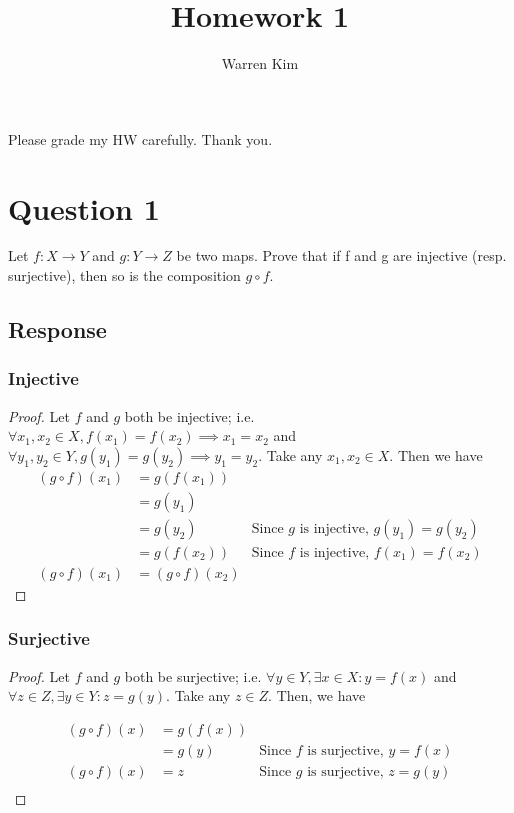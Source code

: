 \documentclass[13pt]{article}
\title{Homework 1}
\author{Warren Kim}
\begin{document}
\maketitle

\begin{center}Please grade my HW carefully. Thank you.\end{center}

\newpage
\section*{Question 1}
Let $f : X \to Y$ and $g : Y \to Z$ be two maps. Prove that if f and g are injective
(resp. surjective), then so is the composition $g \circ f$.

\subsection*{Response}

\subsubsection*{Injective}
\begin{proof}
  Let $f$ and $g$ both be injective; i.e. $\forall x_1, x_2 \in X, f(x_1) = f(x_2) \implies x_1 = x_2$ and
  $\forall y_1, y_2 \in Y, g(y_1) = g(y_2) \implies y_1 = y_2$. Take any $x_1, x_2 \in X$. Then we have
  \begin{align*}
    (g \circ f) (x_1) &= g(f(x_1)) \\
                    &= g(y_1) \\
                    &= g(y_2) & \text{Since $g$ is injective, $g(y_1) = g(y_2)$} \\
                    &= g(f(x_2)) & \text{Since $f$ is injective, $f(x_1) = f(x_2)$} \\
    (g \circ f) (x_1) &= (g \circ f) (x_2)
  \end{align*}
\end{proof}


\subsubsection*{Surjective}
\begin{proof}
  Let $f$ and $g$ both be surjective; i.e. $\forall y \in Y, \exists x \in X : y = f(x)$ and
  $\forall z \in Z, \exists y \in Y : z = g(y)$. Take any $z \in Z$. Then, we have
  
  \begin{align*}
    (g \circ f) (x) &= g(f(x)) \\
                    &= g(y) & \text{Since $f$ is surjective, $y = f(x)$} \\
    (g \circ f)(x) &= z & \text {Since $g$ is surjective, $z = g(y)$} \\
  \end{align*}
\end{proof}
\end{document}
